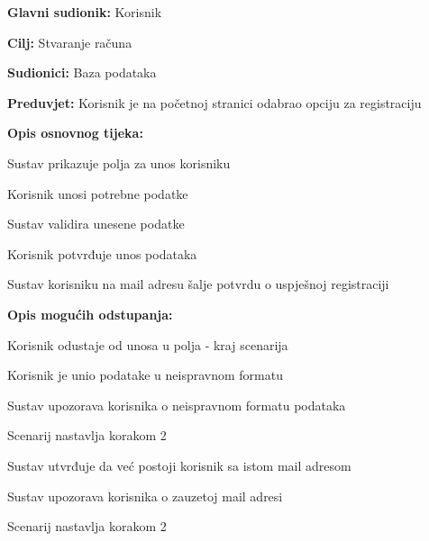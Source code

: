 					\noindent {}
					\begin{packed_item}
	
						\item \textbf{Glavni sudionik: }Korisnik
						\item  \textbf{Cilj:} Stvaranje računa
						\item  \textbf{Sudionici:} Baza podataka
						\item  \textbf{Preduvjet:} Korisnik je na početnoj stranici odabrao opciju za registraciju
						\item  \textbf{Opis osnovnog tijeka:}
						
						\item[] \begin{packed_enum}
							\item Sustav prikazuje polja za unos korisniku
							\item Korisnik unosi potrebne podatke
							\item Sustav validira unesene podatke
							\item Korisnik potvrđuje unos podataka
							\item Sustav korisniku na mail adresu šalje potvrdu o uspješnoj registraciji
						\end{packed_enum}
						
						\item  \textbf{Opis mogućih odstupanja:}

						\item[] \begin{packed_item}
							\item[2.a] Korisnik odustaje od unosa u polja - kraj scenarija
							\item[3.a] Korisnik je unio podatake u neispravnom formatu
							\item[] \begin{packed_enum}
								\item Sustav upozorava korisnika o neispravnom formatu podataka
								\item Scenarij nastavlja korakom 2 
							\end{packed_enum}	
							\item[5.a] Sustav utvrđuje da već postoji korisnik sa istom mail adresom
							\item[] \begin{packed_enum}
								\item Sustav upozorava korisnika o zauzetoj mail adresi
								\item Scenarij nastavlja korakom 2 
							\end{packed_enum}					
						\end{packed_item}
					\end{packed_item}

